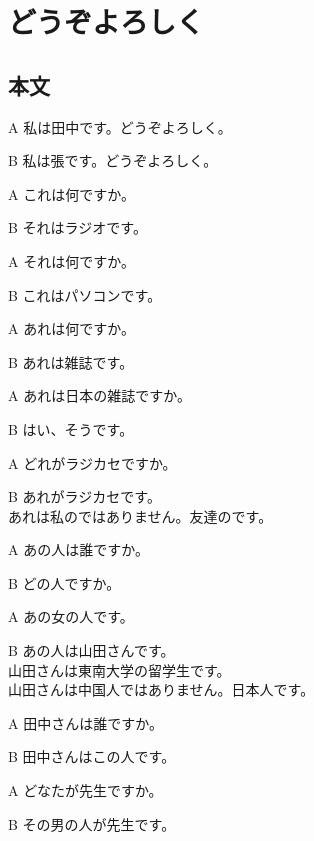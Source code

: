 \documentclass[a5j]{ltjarticle}
\title{\titleContent}
\author{\authorContent}
\begin{document}
\maketitle

\setcounter{section}{1}
\section{どうぞよろしく}

\subsection*{本文}

\begin{dialogue}[labelwidth=\zw]
\item[A] 私は田中です。どうぞよろしく。
\item[B] 私は張です。どうぞよろしく。
\item
\item[A] これは何ですか。
\item[B] それはラジオです。
\item[A] それは何ですか。
\item[B] これはパソコンです。
\item[A] あれは何ですか。
\item[B] あれは雑誌です。
\item[A] あれは日本の雑誌ですか。
\item[B] はい、そうです。
\item[A] どれがラジカセですか。
\item[B] あれがラジカセです。\\
  あれは私のではありません。友達のです。
\item
\item[A] あの人は誰ですか。
\item[B] どの人ですか。
\item[A] あの女の人です。
\item[B] あの人は山田さんです。\\
  山田さんは東南大学の留学生です。\\
  山田さんは中国人ではありません。日本人です。
\item[A] 田中さんは誰ですか。
\item[B] 田中さんはこの人です。
\item[A] どなたが先生ですか。
\item[B] その男の人が先生です。
\end{dialogue}
\end{document}
